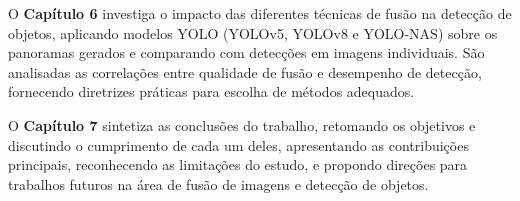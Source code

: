 O \textbf{Capítulo 6} investiga o impacto das diferentes técnicas de fusão na detecção de objetos, aplicando modelos YOLO (YOLOv5, YOLOv8 e YOLO-NAS) sobre os panoramas gerados e comparando com detecções em imagens individuais. São analisadas as correlações entre qualidade de fusão e desempenho de detecção, fornecendo diretrizes práticas para escolha de métodos adequados.

O \textbf{Capítulo 7} sintetiza as conclusões do trabalho, retomando os objetivos e discutindo o cumprimento de cada um deles, apresentando as contribuições principais, reconhecendo as limitações do estudo, e propondo direções para trabalhos futuros na área de fusão de imagens e detecção de objetos.


